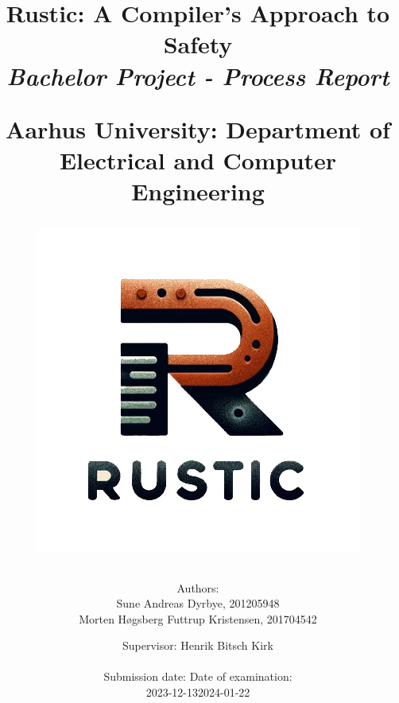 \newcommand{\authorName}{}
\newcommand{\titleName}{Rustic: A Compiler's Approach to Safety}
\newcommand{\subject}{Bachelor Project - Process Report}
\newcommand{\vejleder}{Supervisor: Henrik Bitsch Kirk}
\newcommand{\institute}{Aarhus University: Department of Electrical and Computer Engineering}
\begin{titlepage}
  \centering
    \title
    {
      \Huge \textbf{\titleName}\\
      \scale{\numberSQRTTWO}{\vspace{\sol pt}}
      \LARGE \textit{\subject}
      \scale{\numberSQRTTWO}{\rule{\linewidth}{\sol pt}}

      \textbf{\institute}

      \begin{figure}[h]
        \centering
        \includegraphics[scale=0.65]{02-Body/Images/RusticLogo.png}
      \end{figure}

      \author
    {
      \LARGE Authors: \\
      Sune Andreas Dyrbye, 201205948 \\
      Morten Høgsberg Futtrup Kristensen, 201704542 \\
      }
           \date{
        \Large \vejleder \\
        \hfill \\
        \vspace{1em}
        Submission date: \hfill
        Date of examination:\\
        2023-12-13\hfill 2024-01-22
      }


    }
   
\end{titlepage}
